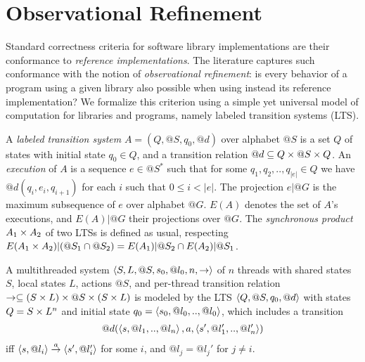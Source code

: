 \section{Observational Refinement}\label{sec:obsref}

\newcommand{\match}{\bowtie}
\newcommand{\call}[2]{{\ensuremath{#1_{#2}}}}
\newcommand{\ret}[1]{{\ensuremath{\mathsf{ret}_{#1}}}}

Standard correctness criteria for software library implementations are their
conformance to \emph{reference implementations}. The literature captures such
conformance with the notion of \emph{observational refinement}: is every
behavior of a program using a given library also possible when using instead
its reference implementation? We formalize this criterion using a simple yet
universal model of computation for libraries and programs, namely labeled
transition systems (LTS).

A \emph{labeled transition system} $A = (Q,@S,q_0,@d)$ over alphabet $@S$ is a
set $Q$ of states with initial state $q_0 \in Q$, and a transition relation $@d
\subseteq Q \times @S \times Q$. An \emph{execution} of $A$ is a sequence $e \in @S^*$ such
that for some $q_1, q_2, .., q_{|e|} \in Q$ we have $@d(q_i,e_i,q_{i+1})$ for
each $i$ such that $0 \le i < |e|$. The projection $e|@G$ is the maximum subsequence of $e$
over alphabet $@G$. $E(A)$ denotes the set of $A$'s executions, and $E(A)|@G$
their projections over $@G$. The \emph{synchronous product} $A_1 \times A_2$ of two
LTSs is defined as usual, respecting $E(A_1 \times A_2)|(@S_1 \cap @S_2) =
E(A_1)|@S_2 \cap E(A_2)|@S_1$.

\begin{example}
  \label{ex:threads:1}

  A multithreaded system $\left\langle {S,L,@S,s_0,@l_0,n,->} \right\rangle$ of $n$ threads with
  shared states $S$, local states $L$, actions $@S$, and per-thread transition
  relation $-> \subseteq (S \times L) \times @S \times (S \times L)$ is modeled by the LTS
  $\left\langle {Q,@S,q_0,@d} \right\rangle$ with states $Q = S \times L^n$ and initial state $q_0 =
  \left\langle {s_0, @l_0, .., @l_0} \right\rangle$, which includes a transition
  \begin{align*}
    @d(\left\langle {s, @l_1, .., @l_n} \right\rangle, a, \left\langle {s', @l_1', .., @l_n'} \right\rangle)
  \end{align*}
  iff $\left\langle {s,@l_i} \right\rangle \overset{a}{\rightarrow} \left\langle {s',@l_i'} \right\rangle$ for some $i$, and
  $@l_j = @l_j'$ for $j \neq i$.
  

\end{example}

